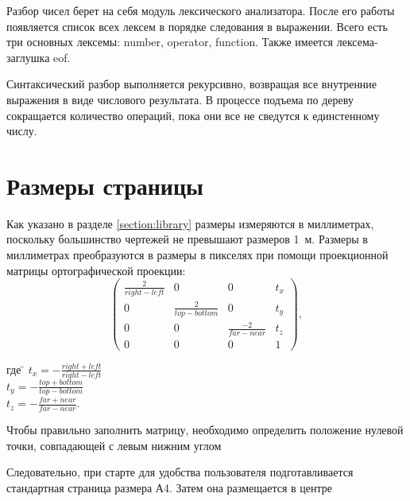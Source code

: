 \documentclass[a4paper, 12pt]{article}
\begin{document}
Разбор чисел берет на себя модуль лексического анализатора. После его работы
появляется список всех лексем в порядке следования в выражении. Всего есть
три основных лексемы: number, operator, function. Также имеется лексема-заглушка
eof.

Синтаксический разбор выполняется рекурсивно, возвращая все внутренние выражения
в виде числового результата. В процессе подъема по дереву сокращается количество
операций, пока они все не сведутся к единстенному числу.

\section{Размеры страницы}
Как указано в разделе \ref{section:library} размеры измеряются в миллиметрах,
поскольку большинство чертежей не превышают размеров 1~м. Размеры в миллиметрах
преобразуются в размеры в пикселях при помощи проекционной матрицы
ортографической проекции:
\begin{equation}
  \begin{pmatrix}
    \frac{2}{right - left} & 0 & 0 & t_x \\
    0 & \frac{2}{top - bottom} & 0 & t_y \\
    0 & 0 & \frac{-2}{far - near} & t_z \\
    0 & 0 & 0 & 1
  \end{pmatrix},
\end{equation}

\begin{tabbing}
где \= $t_x = -\frac{right + left}{right - left}$ \\
\> $t_y = -\frac{top + bottom}{top - bottom}$ \\
\> $t_z = -\frac{far + near}{far - near}$.
\end{tabbing}

Чтобы правильно заполнить матрицу, необходимо определить положение нулевой точки,
совпадающей с левым нижним углом 

Следовательно, при старте для удобства пользователя подготавливается стандартная
страница размера А4. Затем она размещается в центре
\end{document}
